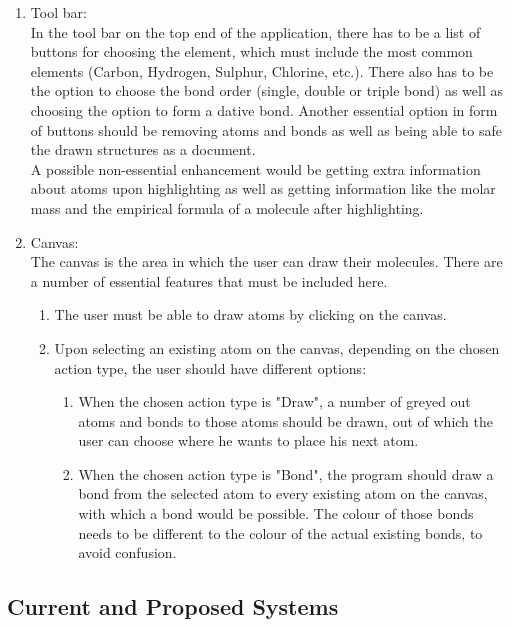 \documentclass[a4paper,12pt]{article}
\begin{document}
\begin{enumerate}

\item Tool bar:\\
In the tool bar on the top end of the application, there has to be a list of buttons for choosing the element, which must include the most common elements (Carbon, Hydrogen, Sulphur, Chlorine, etc.). There also has to be the option to choose the bond order (single, double or triple bond) as well as choosing the option to form a dative bond. Another essential option in form of buttons should be removing atoms and bonds as well as being able to safe the drawn structures as a document.\\
A possible non-essential enhancement would be getting extra information about atoms upon highlighting as well as getting information like the molar mass and the empirical formula of a molecule after highlighting.
\item Canvas:\\
The canvas is the area in which the user can draw their molecules. There are a number of essential features that must be included here.\\
	\begin{enumerate}
	\item The user must be able to draw atoms by clicking on the canvas.
	\item Upon selecting an existing atom on the canvas, depending on the chosen action type, the user should have different options:
		\begin{enumerate}
		\item When the chosen action type is "Draw", a number of greyed out atoms and bonds to those atoms should be drawn, out of which the user can choose where he wants to place his next atom.
		\item When the chosen action type is "Bond", the program should draw a bond from the selected atom to every existing atom on the canvas, with which a bond would be possible. The colour of those bonds needs to be different to the colour of the actual existing 		bonds, to avoid confusion.
		\end{enumerate}
	\end{enumerate}
\end{enumerate}

\subsection{Current and Proposed Systems}
\end{document}
